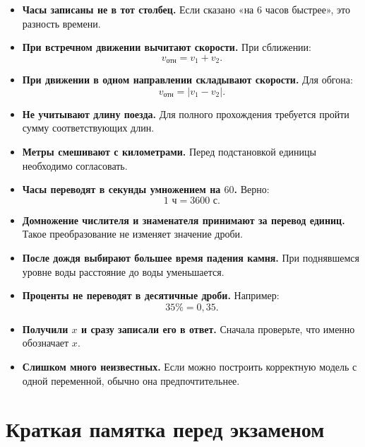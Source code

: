 \documentclass[a4paper,12pt]{article}
\newcommand{\warningtext}[1]{\textcolor{warning}{\textbf{#1}}}
\begin{document}
\begin{itemize}
    \item \warningtext{Часы записаны не в тот столбец.}
    Если сказано «на \(6\) часов быстрее», это разность времени.

    \item \warningtext{При встречном движении вычитают скорости.}
    При сближении:
    \[
    v_{\text{отн}}=v_1+v_2.
    \]

    \item \warningtext{При движении в одном направлении складывают скорости.}
    Для обгона:
    \[
    v_{\text{отн}}=|v_1-v_2|.
    \]

    \item \warningtext{Не учитывают длину поезда.}
    Для полного прохождения требуется пройти сумму соответствующих длин.

    \item \warningtext{Метры смешивают с километрами.}
    Перед подстановкой единицы необходимо согласовать.

    \item \warningtext{Часы переводят в секунды умножением на \(60\).}
    Верно:
    \[
    1\text{ ч}=3600\text{ с}.
    \]

    \item \warningtext{Домножение числителя и знаменателя принимают за перевод единиц.}
    Такое преобразование не изменяет значение дроби.

    \item \warningtext{После дождя выбирают большее время падения камня.}
    При поднявшемся уровне воды расстояние до воды уменьшается.

    \item \warningtext{Проценты не переводят в десятичные дроби.}
    Например:
    \[
    35\%=0{,}35.
    \]

    \item \warningtext{Получили \(x\) и сразу записали его в ответ.}
    Сначала проверьте, что именно обозначает \(x\).

    \item \warningtext{Слишком много неизвестных.}
    Если можно построить корректную модель с одной переменной,
    обычно она предпочтительнее.
\end{itemize}


\section{Краткая памятка перед экзаменом}
\end{document}
